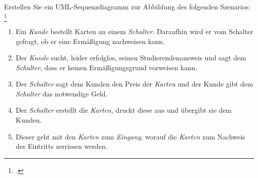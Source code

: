 \documentclass{bschlangaul-aufgabe}
\begin{document}

Erstellen Sie ein UML-Sequenzdiagramm zur Abbildung des folgenden
Szenarios:
\footcite{examen:66116:2020:03}

\begin{enumerate}
\item Ein \emph{Kunde} bestellt Karten an einem \emph{Schalter}.
Daraufhin wird er vom Schalter gefragt, ob er eine Ermäßigung nachweisen
kann.

\item Der \emph{Kunde} sucht, leider erfolglos, seinen
Studierendenausweis und sagt dem \emph{Schalter}, dass er keinen
Ermäßigungsgrund vorweisen kann.

\item Der \emph{Schalter} sagt dem Kunden den Preis der \emph{Karten}
und der Kunde gibt dem \emph{Schalter} das notwendige Geld.

\item Der \emph{Schalter} erstellt die \emph{Karten}, druckt diese aus
und übergibt sie dem Kunden.

\item Dieser geht mit den \emph{Karten} zum \emph{Eingang}, worauf die
\emph{Karten} zum Nachweis des Eintritts zerrissen werden.
\end{enumerate}
\end{document}
